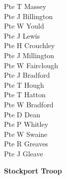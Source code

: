 \begin{multicols}{3}
  Pte T Massey \\
  Pte J Billington \\
  Pte W Yould \\
  Pte J Lewis \\
  Pte H Crouchley \\
  Pte J Millington \\
  Pte W Fairclough \\
  Pte J Bradford \\
  Pte T Hough \\
  Pte T Hatton \\
  Pte W Bradford \\
  Pte D Dean \\
  Pte P Whitley \\
  Pte W Swaine \\
  Pte R Greaves \\
  Pte J Gleave \\
\end{multicols}

\vspace*{10mm}

\begin{center}
  \Large
  \textbf{Stockport Troop}
\end{center}

